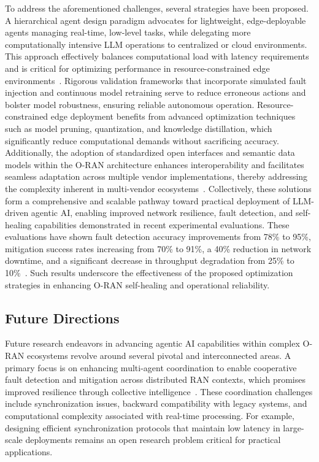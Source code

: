 \documentclass[sigconf]{acmart}
\begin{document}
To address the aforementioned challenges, several strategies have been proposed. A hierarchical agent design paradigm advocates for lightweight, edge-deployable agents managing real-time, low-level tasks, while delegating more computationally intensive LLM operations to centralized or cloud environments. This approach effectively balances computational load with latency requirements and is critical for optimizing performance in resource-constrained edge environments~\cite{ref55}. Rigorous validation frameworks that incorporate simulated fault injection and continuous model retraining serve to reduce erroneous actions and bolster model robustness, ensuring reliable autonomous operation. Resource-constrained edge deployment benefits from advanced optimization techniques such as model pruning, quantization, and knowledge distillation, which significantly reduce computational demands without sacrificing accuracy. Additionally, the adoption of standardized open interfaces and semantic data models within the O-RAN architecture enhances interoperability and facilitates seamless adaptation across multiple vendor implementations, thereby addressing the complexity inherent in multi-vendor ecosystems~\cite{ref55}. Collectively, these solutions form a comprehensive and scalable pathway toward practical deployment of LLM-driven agentic AI, enabling improved network resilience, fault detection, and self-healing capabilities demonstrated in recent experimental evaluations. These evaluations have shown fault detection accuracy improvements from 78\% to 95\%, mitigation success rates increasing from 70\% to 91\%, a 40\% reduction in network downtime, and a significant decrease in throughput degradation from 25\% to 10\%~\cite{ref55}. Such results underscore the effectiveness of the proposed optimization strategies in enhancing O-RAN self-healing and operational reliability.

\subsection{Future Directions}

Future research endeavors in advancing agentic AI capabilities within complex O-RAN ecosystems revolve around several pivotal and interconnected areas. A primary focus is on enhancing multi-agent coordination to enable cooperative fault detection and mitigation across distributed RAN contexts, which promises improved resilience through collective intelligence~\cite{ref21}. These coordination challenges include synchronization issues, backward compatibility with legacy systems, and computational complexity associated with real-time processing. For example, designing efficient synchronization protocols that maintain low latency in large-scale deployments remains an open research problem critical for practical applications.
\end{document}
